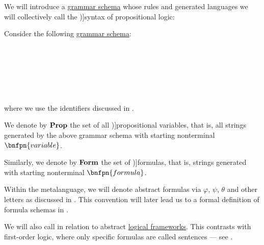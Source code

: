 \begin{definition}\label{def:propositional_syntax}\mimprovised
  We will introduce a \hyperref[def:formal_grammar/schema]{grammar schema} whose rules and generated languages we will collectively call the \term[en=syntax (\cite[8]{Hinman2005})]{syntax} of propositional logic:
  \begin{thmenum}
     Consider the following \hyperref[def:formal_grammar/schema]{grammar schema}:
    \begin{bnf*}
          {} \\
        {\bnftsq{\( \synvee \)} \bnfor \bnftsq{\( \synwedge \)} \bnfor \bnftsq{\( \synimplies \)}\bnfor \bnftsq{\( \syniff \)}} \\
           {\bnftsq{\( \syntop \)} \bnfor \bnftsq{\( \synbot \)} \bnfor} \\
       \\
       \\
    \end{bnf*}
    where we use the identifiers discussed in .

     We denote by \( \op*{Prop} \) the set of all \term[ru=пропозициональные переменные (\cite[43]{КолмогоровДрагалин2006})]{propositional variables}, that is, all strings generated by the above grammar schema with starting nonterminal \( \bnfpn{variable} \).

     Similarly, we denote by \( \op*{Form} \) the set of \term[ru=формула (\cite[43]{КолмогоровДрагалин2006})]{formulas}, that is, strings generated with starting nonterminal \( \bnfpn{formula} \).

    Within the metalanguage, we will denote abstract formulas via \( \varphi \), \( \psi \), \( \theta \) and other letters as discussed in . This convention will later lead us to a formal definition of formula schemas in .

    We will also call  in relation to abstract \hyperref[def:logical_framework]{logical frameworks}. This contrasts with first-order logic, where only specific formulas are called sentences --- see .


\end{thmenum}
\end{definition}
